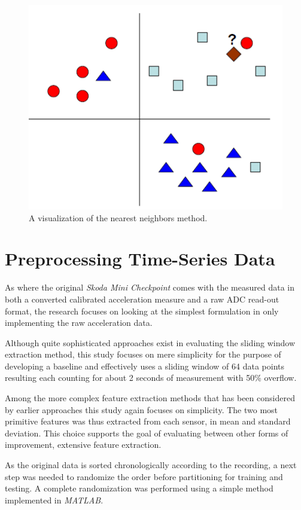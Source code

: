 \documentclass{sig-alternate}
\begin{document}

\begin{figure}[t]
\begin{center}
  \includegraphics[width=0.6\linewidth]{non_tech_imgs/knn_vis.png}
\end{center}
  \caption{A visualization of the nearest neighbors method.}
  \label{fig:knn_vis}
\end{figure}

\section{Preprocessing Time-Series Data}
As where the original \textit{Skoda Mini Checkpoint} comes with the measured data in both a converted calibrated acceleration measure and a raw ADC read-out format, the research focuses on looking at the simplest formulation in only implementing the raw acceleration data.

Although quite sophisticated approaches exist in evaluating the sliding window extraction method, this study focuses on mere simplicity for the purpose of developing a baseline and effectively uses a sliding window of 64 data points resulting each counting for about 2 seconds of measurement with 50\% overflow\cite{Zhang}.

Among the more complex feature extraction methods that has been considered by earlier approaches this study again focuses on simplicity. The two most primitive features was thus extracted from each sensor, in mean and standard deviation. This choice supports the goal of evaluating between other forms of improvement, extensive feature extraction.

As the original data is sorted chronologically according to the recording, a next step was needed to randomize the order before partitioning for training and testing. A complete randomization was performed using a simple method implemented in \textit{MATLAB}.
\end{document}
